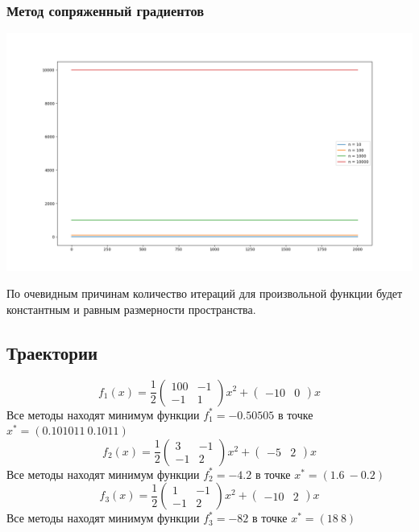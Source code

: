 \documentclass[english]{article}
\theoremstyle{plain}
\theoremstyle{remark}
\theoremstyle{definition}
\begin{document}
\subsubsection{Метод сопряженный градиентов}
\label{sec:org947248c}
\begin{center}
\includegraphics[scale=0.4]{plots/conjugate_gradient_1.png}
\end{center} По очевидным причинам количество
итераций для произвольной функции будет константным и равным
размерности пространства.
\subsection{Траектории}
\label{sec:org821faae}
\[ f_1(x) = \frac{1}{2}\begin{pmatrix}
100 & -1 \\
-1 & 1
\end{pmatrix} x^2 + \begin{pmatrix} -10 & 0 \end{pmatrix}x\]
Все методы находят минимум функции \(f_1^* = -0.50505\) в точке \(x^* = (0.101011\ 0.1011)\)
\[ f_2(x) = \frac{1}{2}\begin{pmatrix}
3 & -1 \\
-1 & 2
\end{pmatrix} x^2 + \begin{pmatrix} -5 & 2 \end{pmatrix}x\]
Все методы находят минимум функции \(f_2^* = -4.2\) в точке \(x^* = (1.6\ -0.2)\)
\[ f_3(x) = \frac{1}{2}\begin{pmatrix}
1 & -1 \\
-1 & 2
\end{pmatrix} x^2 + \begin{pmatrix} -10 & 2 \end{pmatrix}x\]
Все методы находят минимум функции \(f_3^* = -82\) в точке \(x^* = (18\ 8)\) \\
\end{document}
